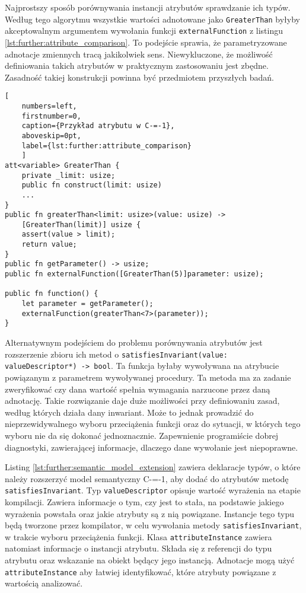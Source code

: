 Najprostszy sposób porównywania instancji atrybutów sprawdzanie ich typów.
Według tego algorytmu wszystkie wartości adnotowane jako \lstinline{GreaterThan} byłyby akceptowalnym argumentem wywołania funkcji \lstinline{externalFunction} z listingu \ref{lst:further:attribute_comparison}.
To podejście sprawia, że parametryzowane adnotacje zmiennych tracą jakikolwiek sens.
Niewykluczone, że możliwość definiowania takich atrybutów w praktycznym zastosowaniu jest zbędne.
Zasadność takiej konstrukcji powinna być przedmiotem przyszłych badań.

\begin{lstlisting}[
	numbers=left,
	firstnumber=0,
	caption={Przykład atrybutu w C-=-1},
	aboveskip=0pt,
	label={lst:further:attribute_comparison}
	]
att<variable> GreaterThan {
	private _limit: usize;
	public fn construct(limit: usize)
	...
}
public fn greaterThan<limit: usize>(value: usize) -> 
	[GreaterThan(limit)] usize {
	assert(value > limit);
	return value;
}
public fn getParameter() -> usize;
public fn externalFunction([GreaterThan(5)]parameter: usize);

public fn function() {
	let parameter = getParameter();
	externalFunction(greaterThan<7>(parameter));
}
\end{lstlisting}

Alternatywnym podejściem do problemu porównywania atrybutów jest rozszerzenie zbioru ich metod o \lstinline{satisfiesInvariant(value: valueDescriptor*) -> bool}.
Ta funkcja byłaby wywoływana na atrybucie powiązanym z parametrem wywoływanej procedury.
Ta metoda ma za zadanie zweryfikować czy dana wartość spełnia wymagania narzucone przez daną adnotację.
Takie rozwiązanie daje duże możliwości przy definiowaniu zasad, według których działa dany inwariant.
Może to jednak prowadzić do nieprzewidywalnego wyboru przeciążenia funkcji oraz do sytuacji, w których tego wyboru nie da się dokonać jednoznacznie.
Zapewnienie programiście dobrej diagnostyki, zawierającej informacje, dlaczego dane wywołanie jest niepoprawne.

Listing \ref{lst:further:semantic_model_extension} zawiera deklaracje typów, o które należy rozszerzyć model semantyczny C-=-1, aby dodać do atrybutów metodę \lstinline{satisfiesInvariant}.
Typ \lstinline{valueDescriptor} opisuje wartość wyrażenia na etapie kompilacji.
Zawiera informacje o tym, czy jest to stała, na podstawie jakiego wyrażenia powstała oraz jakie atrybuty są z nią powiązane.
Instancje tego typu będą tworzone przez kompilator, w celu wywołania metody \lstinline{satisfiesInvariant}, w trakcie wyboru przeciążenia funkcji.
Klasa \lstinline{attributeInstance} zawiera natomiast informacje o instancji atrybutu.
Składa się z referencji do typu atrybutu oraz wskazanie na obiekt będący jego instancją.
Adnotacje mogą użyć \lstinline{attributeInstance} aby łatwiej identyfikować, które atrybuty powiązane z wartością analizować.

